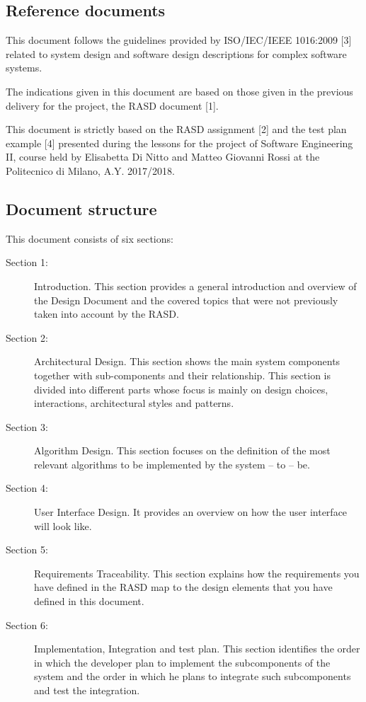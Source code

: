 \documentclass{article}
\begin{document}
	
	\subsection{Reference documents}
	This document follows the guidelines provided by ISO/IEC/IEEE 1016:2009 [3] related to system design and software design descriptions for complex software systems.

	\bigskip
	The indications given in this document are based on those given in the previous delivery for the project, the RASD document [1].
	
	\bigskip
	This document is strictly based on the RASD assignment [2] and the test plan example [4] presented during the lessons for the project of Software Engineering II, course held by Elisabetta Di Nitto and Matteo Giovanni Rossi at the Politecnico di Milano, A.Y. 2017/2018.
	
	
	\subsection{Document structure}

	This document consists of six sections:

	\begin{description}
	\item[Section 1:] Introduction. This section provides a general introduction and overview of the Design Document and the covered topics that were not previously taken into account by the RASD.
	\item[Section 2:] Architectural Design. This section shows the main system components together with sub-components and their relationship. This section is divided into different parts whose focus is mainly on design choices, interactions, architectural styles and patterns.
	\item[Section 3:] Algorithm Design. This section focuses on the definition of the most relevant algorithms to be implemented by the system – to – be.
	\item[Section 4:] User Interface Design. It provides an overview on how the user interface will look like.
	\item[Section 5:] Requirements Traceability. This section explains how the requirements you have defined in the RASD map to the design elements that you have defined in this document.
	\item[Section 6:] Implementation, Integration and test plan. This section identifies the order in which the developer plan to implement the subcomponents of the system and the order in which he plans to integrate such subcomponents and test the integration.
	\end{description}
\end{document}
